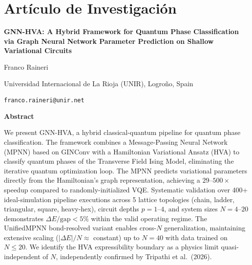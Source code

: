 \documentclass[11pt,a4paper,spanish]{book}
\begin{document}

\chapter{Artículo de Investigación}
\label{app:articulo}


\begin{center}
{\LARGE \textbf{GNN-HVA: A Hybrid Framework for Quantum Phase Classification via Graph Neural Network Parameter Prediction on Shallow Variational Circuits}}

\vspace{0.5cm}

{\large Franco Raineri}

\vspace{0.2cm}

{\normalsize Universidad Internacional de La Rioja (UNIR), Logroño, Spain}

{\normalsize \texttt{franco.raineri@unir.net}}

\vspace{0.5cm}

{\textbf{Abstract}}
\end{center}

\noindent We present GNN-HVA, a hybrid classical-quantum pipeline for quantum phase classification. The framework combines a Message-Passing Neural Network (MPNN) based on GINConv with a Hamiltonian Variational Ansatz (HVA) to classify quantum phases of the Transverse Field Ising Model, eliminating the iterative quantum optimization loop. The MPNN predicts variational parameters directly from the Hamiltonian's graph representation, achieving a $29$--$500\times$ speedup compared to randomly-initialized VQE. Systematic validation over 400+ ideal-simulation pipeline executions across 5 lattice topologies (chain, ladder, triangular, square, heavy-hex), circuit depths $p = 1$--$4$, and system sizes $N = 4$--$20$ demonstrates $\Delta E/\text{gap} < 5\%$ within the valid operating regime. The UnifiedMPNN bond-resolved variant enables cross-$N$ generalization, maintaining extensive scaling ($|\Delta E|/N \approx$ constant) up to $N = 40$ with data trained on $N \leq 20$. We identify the HVA expressibility boundary as a physics limit quasi-independent of $N$, independently confirmed by Tripathi et al.\ (2026).
\end{document}
